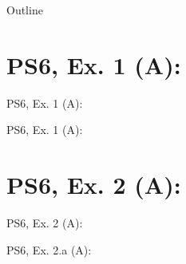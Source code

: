 

\maketitle

\begin{frame}{Outline}
    \tableofcontents
\end{frame}



\section{PS6, Ex. 1 (A): }

\begin{frame}{PS6, Ex. 1 (A): }
  \begin{multicols}{2}
    \vfill\null \columnbreak
    \vfill\null
  \end{multicols}
\end{frame}

\begin{frame}{PS6, Ex. 1 (A): }
  \begin{multicols}{2}
    \vfill\null \columnbreak
    \vfill\null
  \end{multicols}
\end{frame}



\section{PS6, Ex. 2 (A): }

\begin{frame}{PS6, Ex. 2 (A): }
  \begin{multicols}{2}
    \vfill\null \columnbreak
    \vfill\null
  \end{multicols}
\end{frame}

\begin{frame}{PS6, Ex. 2.a (A): }
  \begin{multicols}{2}
    \vfill\null \columnbreak
    \vfill\null
  \end{multicols}
\end{frame}



